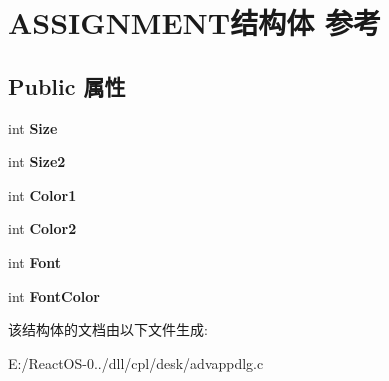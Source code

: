 \hypertarget{struct_a_s_s_i_g_n_m_e_n_t}{}\section{A\+S\+S\+I\+G\+N\+M\+E\+N\+T结构体 参考}
\label{struct_a_s_s_i_g_n_m_e_n_t}
\subsection*{Public 属性}
\begin{DoxyCompactItemize}
\item 
\mbox{\label{struct_a_s_s_i_g_n_m_e_n_t_afb5fdabcf9d0e6655ea86586001d6415}} 
int {\bfseries Size}
\item 
\mbox{\label{struct_a_s_s_i_g_n_m_e_n_t_aca70dfb071367176f45d31a252423750}} 
int {\bfseries Size2}
\item 
\mbox{\label{struct_a_s_s_i_g_n_m_e_n_t_a5eba2a612315da3c7bc9fbd9dbe28bc3}} 
int {\bfseries Color1}
\item 
\mbox{\label{struct_a_s_s_i_g_n_m_e_n_t_af3750ffaa197785512530f88ade2f740}} 
int {\bfseries Color2}
\item 
\mbox{\label{struct_a_s_s_i_g_n_m_e_n_t_a866fca46ab727d7a3c4bb21f6e1412be}} 
int {\bfseries Font}
\item 
\mbox{\label{struct_a_s_s_i_g_n_m_e_n_t_ac6078a37e08328b2c39d35d5b4b0b8f1}} 
int {\bfseries Font\+Color}
\end{DoxyCompactItemize}


该结构体的文档由以下文件生成\+:\begin{DoxyCompactItemize}
\item 
E\+:/\+React\+O\+S-\/0../dll/cpl/desk/advappdlg.\+c\end{DoxyCompactItemize}
